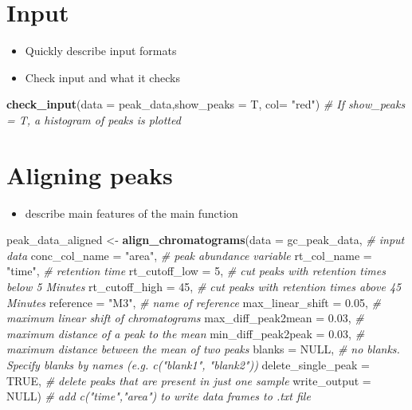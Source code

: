 \documentclass[]{article}
\newenvironment{Shaded}{}{}
\newcommand{\KeywordTok}[1]{\textbf{{#1}}}
\newcommand{\DataTypeTok}[1]{\textcolor[rgb]{0.50,0.00,0.00}{{#1}}}
\newcommand{\DecValTok}[1]{\textcolor[rgb]{0.00,0.00,1.00}{{#1}}}
\newcommand{\FloatTok}[1]{\textcolor[rgb]{0.50,0.00,0.50}{{#1}}}
\newcommand{\StringTok}[1]{\textcolor[rgb]{0.87,0.00,0.00}{{#1}}}
\newcommand{\CommentTok}[1]{\textcolor[rgb]{0.50,0.50,0.50}{\textit{{#1}}}}
\newcommand{\OtherTok}[1]{{#1}}
\newcommand{\NormalTok}[1]{{#1}}
\providecommand{\tightlist}{%
  \setlength{\itemsep}{0pt}\setlength{\parskip}{0pt}}
\begin{document}
\section{Input}\label{input}

\begin{itemize}
\tightlist
\item
  Quickly describe input formats
\item
  Check input and what it checks
\end{itemize}

\begin{Shaded}
\begin{Highlighting}[]
\KeywordTok{check_input}\NormalTok{(}\DataTypeTok{data =} \NormalTok{peak_data,}\DataTypeTok{show_peaks =} \NormalTok{T, }\DataTypeTok{col=} \StringTok{"red"}\NormalTok{) }\CommentTok{# If show_peaks = T, a histogram of peaks is plotted }
\end{Highlighting}
\end{Shaded}

\section{Aligning peaks}\label{aligning-peaks}

\begin{itemize}
\tightlist
\item
  describe main features of the main function
\end{itemize}

\begin{Shaded}
\begin{Highlighting}[]
\NormalTok{peak_data_aligned <-}\StringTok{ }\KeywordTok{align_chromatograms}\NormalTok{(}\DataTypeTok{data =} \NormalTok{gc_peak_data, }\CommentTok{# input data}
    \DataTypeTok{conc_col_name =} \StringTok{"area"}\NormalTok{, }\CommentTok{# peak abundance variable}
    \DataTypeTok{rt_col_name =} \StringTok{"time"}\NormalTok{, }\CommentTok{# retention time }
    \DataTypeTok{rt_cutoff_low =} \DecValTok{5}\NormalTok{, }\CommentTok{# cut peaks with retention times below 5 Minutes}
    \DataTypeTok{rt_cutoff_high =} \DecValTok{45}\NormalTok{, }\CommentTok{# cut peaks with retention times above 45 Minutes}
    \DataTypeTok{reference =} \StringTok{"M3"}\NormalTok{, }\CommentTok{# name of reference }
    \DataTypeTok{max_linear_shift =} \FloatTok{0.05}\NormalTok{, }\CommentTok{# maximum linear shift of chromatograms}
    \DataTypeTok{max_diff_peak2mean =} \FloatTok{0.03}\NormalTok{, }\CommentTok{# maximum distance of a peak to the mean}
    \DataTypeTok{min_diff_peak2peak =} \FloatTok{0.03}\NormalTok{, }\CommentTok{# maximum distance between the mean of two peaks}
    \DataTypeTok{blanks =} \OtherTok{NULL}\NormalTok{, }\CommentTok{# no blanks. Specify blanks by names (e.g. c("blank1", "blank2"))}
    \DataTypeTok{delete_single_peak =} \OtherTok{TRUE}\NormalTok{, }\CommentTok{# delete peaks that are present in just one sample }
    \DataTypeTok{write_output =} \OtherTok{NULL}\NormalTok{) }\CommentTok{# add c("time","area") to write data frames to .txt file}
\end{Highlighting}
\end{Shaded}
\end{document}
